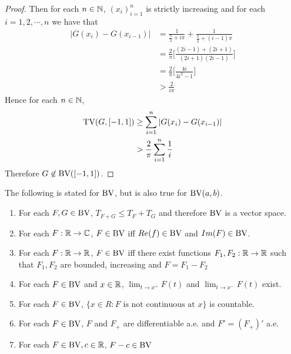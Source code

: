 \documentclass{book}
\begin{document}
\begin{proof}
		Then for each $n \in \mathbb{N}$, $(x_i)_{i=1}^n$ is strictly increasing and for each $i=1,2,\cdots, n$ we have that 
		\begin{align*}
			|G(x_i)-G(x_{i-1})|
			&=\frac{1}{\frac{\pi}{2}+i\pi}+ \frac{1}{\frac{\pi}{2}+(i-1)\pi}\\
			&=\frac{2}{\pi}\bigg[\frac{(2i-1)+(2i+1)}{(2i+1)(2i-1)}\bigg]\\
			&=\frac{2}{\pi}\bigg[\frac{4i}{4i^2-1}\bigg]\\
			& > \frac{2}{i\pi}
		\end{align*}
		\newpage
		Hence for each $n \in \mathbb{N}$,
		\begin{align*}
			\text{TV}(G,[-1,1]) 
			&\geq \sum_{i=1}^n|G(x_i)-G(x_{i-1})| \\
			& > \frac{2}{\pi}\sum_{i=1}^n \frac{1}{i}
		\end{align*}
		Therefore $G \not \in \text{BV}([-1,1])$.
	\end{proof}
	
	\begin{ex}   The following is stated for $\text{BV}$, but is also true for $\text{BV}(a,b)$.
		
		\begin{enumerate} 
			\item For each $F,G \in \text{BV}$, $T_{F+G} \leq T_F + T_G$ and therefore $\text{BV}$ is a vector space. 
			\item For each $F: \mathbb{R} \rightarrow \mathbb{C}$, $F \in \text{BV}$ iff $Re(f) \in \text{BV}$ and $Im(F) \in \text{BV}$.
			\item For each $F:\mathbb{R} \rightarrow \mathbb{R}$, $F \in \text{BV}$ iff there exist functions $F_1,F_2:\mathbb{R} \rightarrow \mathbb{R}$ such that $F_1,F_2$ are bounded, increasing and $F=F_1-F_2$
			\item For each $F \in \text{BV}$ and $x \in \mathbb{R}$, $\lim_{t \rightarrow x^+}F(t)$ and $\lim_{t \rightarrow x^-}F(t)$ exist. 
			\item For each $F \in \text{BV}$, $\{x \in R: F \text{ is not continuous at }x\}$ is countable.
			\item For each $F \in \text{BV}$, $F$ and $F_+$ are differentiable a.e. and $F'=(F_+)'$ a.e.
			\item For each $F \in \text{BV}, c \in \mathbb{R}$, $F-c \in \text{BV}$
		\end{enumerate}
	\end{ex}
	
\end{document}

